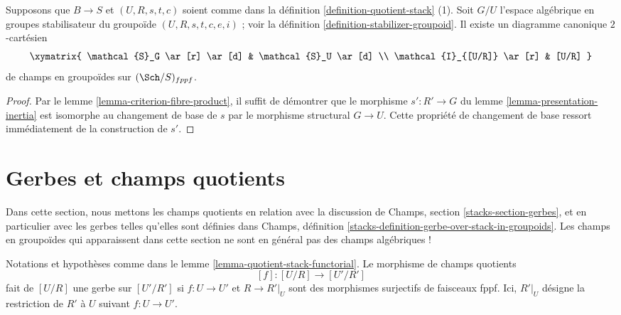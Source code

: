 \begin{lemma}
\label{lemma-2-cartesian-inertia}
Supposons que $B \to S$ et $(U, R, s, t, c)$ soient comme dans la
définition \ref{definition-quotient-stack} (1). Soit $G/U$ l'espace
algébrique en groupes stabilisateur du groupoïde
$(U, R, s, t, c, e, i)$ ; voir la définition
\ref{definition-stabilizer-groupoid}. Il existe un diagramme canonique
$2$-cartésien
$$
\xymatrix{
\mathcal{S}_G \ar[r] \ar[d] & \mathcal{S}_U \ar[d] \\
\mathcal{I}_{[U/R]} \ar[r] & [U/R]
}
$$
de champs en groupoïdes sur $(\Sch/S)_{fppf}$.
\end{lemma}

\begin{proof}
Par le lemme \ref{lemma-criterion-fibre-product}, il suffit de démontrer que
le morphisme $s' : R' \to G$ du lemme \ref{lemma-presentation-inertia} est
isomorphe au changement de base de $s$ par le morphisme structural
$G \to U$. Cette propriété de changement de base ressort immédiatement de
la construction de $s'$.
\end{proof}







\section{Gerbes et champs quotients}
\label{section-gerbes}

\noindent
Dans cette section, nous mettons les champs quotients en relation avec la
discussion de Champs, section \ref{stacks-section-gerbes}, et en particulier
avec les gerbes telles qu'elles sont définies dans Champs, définition
\ref{stacks-definition-gerbe-over-stack-in-groupoids}. Les champs en
groupoïdes qui apparaissent dans cette section ne sont en général pas des
champs algébriques !

\begin{lemma}
\label{lemma-when-gerbe}
Notations et hypothèses comme dans le lemme
\ref{lemma-quotient-stack-functorial}. Le morphisme de champs quotients
$$
[f] : [U/R] \longrightarrow [U'/R']
$$
fait de $[U/R]$ une gerbe sur $[U'/R']$ si $f : U \to U'$ et
$R \to R'|_U$ sont des morphismes surjectifs de faisceaux fppf. Ici,
$R'|_U$ désigne la restriction de $R'$ à $U$ suivant $f : U \to U'$.
\end{lemma}

